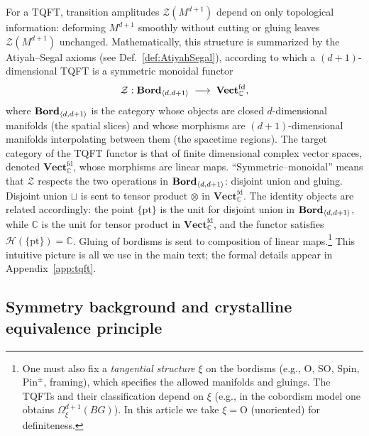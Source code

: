 \documentclass[aps,prx,reprint,superscriptaddress,twocolumn,amsmath,amssymb,amsfonts, nofootinbib]{revtex4-2}
\newcommand{\bordd}{{\bf Bord}_{\langle d, d+1\rangle}}
\theoremstyle{apsstyle}
\begin{document}
 For a TQFT, transition amplitudes $\mathcal{Z}(M^{d+1})$ depend on only topological information: deforming $M^{d+1}$ smoothly without cutting or gluing leaves $\mathcal Z(M^{d+1})$ unchanged. Mathematically, this structure is summarized by the Atiyah–Segal axioms (see Def.~\ref{def:AtiyahSegal}), according to which a $(d{+}1)$-dimensional TQFT is a symmetric monoidal functor 
\begin{equation*}
    \mathcal{Z}: \bordd \;\longrightarrow\; \mathbf{Vect}^{\mathrm{fd}}_{\mathbb{C}},
\end{equation*}
where $\bordd$ is the category whose objects are closed $d$-dimensional manifolds (the spatial slices) and whose morphisms are $(d{+}1)$-dimensional manifolds interpolating between them (the spacetime regions). The target category of the TQFT functor is that of finite dimensional complex vector spaces, denoted $\mathbf{Vect}^{\mathrm{fd}}_{\mathbb{C}}$, whose morphisms are linear maps. “Symmetric–monoidal” means that $\mathcal Z$ respects the two operations in $\bordd$: disjoint union and gluing.  Disjoint union $\sqcup$ is sent to tensor product $\otimes$ in $\mathbf{Vect}^{\mathrm{fd}}_{\mathbb{C}}$. The identity objects are related accordingly: the point $\{\mathrm{pt}\}$ is the unit for disjoint union in $\bordd$, while $\mathbb{C}$ is the unit for tensor product in $\mathbf{Vect}^{\mathrm{fd}}_{\mathbb{C}}$, and the functor satisfies $\mathcal H(\{\mathrm{pt}\})=\mathbb{C}$. Gluing of bordisms is sent to composition of linear maps.\footnote{One must also fix a \emph{tangential structure} $\xi$ on the bordisms (e.g., $\mathrm{O}$, $\mathrm{SO}$, $\mathrm{Spin}$, $\mathrm{Pin}^{\pm}$, framing), which specifies the allowed manifolds and gluings. The TQFTs and their classification depend on $\xi$ (e.g., in the cobordism model one obtains $\Omega^{d+1}_{\xi}(BG)$). In this article we take $\xi=\mathrm{O}$ (unoriented) for definiteness.} This intuitive picture is all we use in the main text; the formal details appear in Appendix~\ref{app:tqft}.


\subsection{Symmetry background and crystalline equivalence principle}
\label{sec:symBG}
\end{document}
